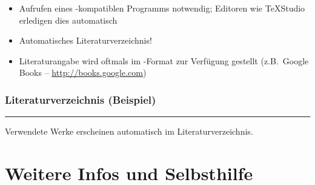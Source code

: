 \begin{frame}[<+->]
	\begin{itemize}
		\item Aufrufen eines -kompatiblen Programms notwendig; Editoren wie TeXStudio erledigen dies automatisch
		\item Automatisches Literaturverzeichnis!
		\item Literaturangabe wird oftmals im -Format zur Verfügung gestellt (z.B.\ Google Books -- \url{http://books.google.com})
	\end{itemize}
	
\end{frame}

\begin{frame}[<+->]
	\frametitle{Literaturverzeichnis (Beispiel)}
	\nocite{sakurai2014modern}
	\printbibliography
	
	\hrule\bigskip
	
	Verwendete Werke erscheinen automatisch im Literaturverzeichnis.
\end{frame}

\section{Weitere Infos und Selbsthilfe}

